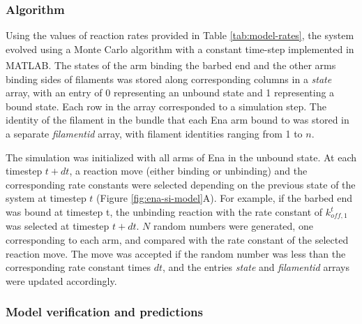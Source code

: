 \subsubsection{Algorithm}\label{ena-si-algorithm}
Using the values of reaction rates provided in Table \ref{tab:model-rates}, the system evolved using a Monte Carlo algorithm with a constant time-step implemented in MATLAB\textsuperscript{\textregistered}. The states of the arm binding the barbed end and the other arms binding sides of filaments was stored along corresponding columns in a \textit{state} array, with an entry of 0 representing an unbound state and 1 representing a bound state. Each row in the array corresponded to a simulation step. The identity of the filament in the bundle that each Ena arm bound to was stored in a separate \textit{filamentid} array, with filament identities ranging from 1 to $n$. 

The simulation was initialized with all arms of Ena in the unbound state. At each timestep $t + dt$, a reaction move (either binding or unbinding) and the corresponding rate constants were selected depending on the previous state of the system at timestep $t$ (Figure \ref{fig:ena-si-model}A). For example, if the barbed end was bound at timestep t, the unbinding reaction with the rate constant of $k_{off,1}^{t}$ was selected at timestep $t + dt$. $N$ random numbers were generated, one corresponding to each arm, and compared with the rate constant of the selected reaction move. The move was accepted if the random number was less than the corresponding rate constant times $dt$, and the entries \textit{state} and \textit{filamentid} arrays were updated accordingly.

\subsubsection{Model verification and predictions}\label{ena-si-predictions}

